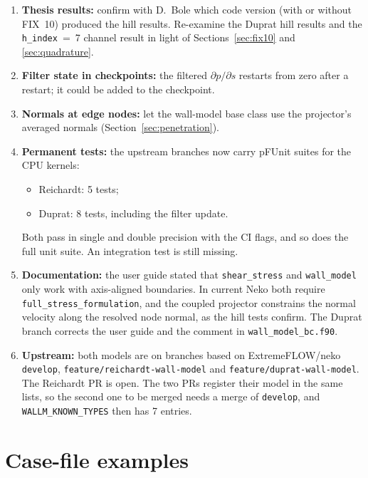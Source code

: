 \documentclass[11pt,a4paper]{article}
\newcommand{\code}[1]{\texttt{#1}}
\newcommand{\dpds}{\partial p/\partial s}
\begin{document}
\begin{enumerate}
    version this matched the \code{force\_torque} skin friction of the hill
    wall to 0.4\,\%; with the reversed stress it is 16\,\% too high
    (Section~\ref{sec:dupv2}). A signed streamwise $\tau_w$ would resolve
    the bubble and the reversed branch.
  \item \textbf{Thesis results:} confirm with D.~Bole which code version
    (with or without FIX~10) produced the hill results. Re-examine the
    Duprat hill results and the \code{h\_index}~=~7 channel result in light
    of Sections~\ref{sec:fix10} and \ref{sec:quadrature}.
  \item \textbf{Filter state in checkpoints:} the filtered $\dpds$ restarts
    from zero after a restart; it could be added to the checkpoint.
  \item \textbf{Normals at edge nodes:} let the wall-model base class use
    the projector's averaged normals (Section~\ref{sec:penetration}).
  \item \textbf{Permanent tests:} the upstream branches now carry pFUnit
    suites for the CPU kernels:
    \begin{itemize}
      \item Reichardt: 5 tests;
      \item Duprat: 8 tests, including the filter update.
    \end{itemize}
    Both pass in single and double precision with the CI flags, and so does
    the full unit suite. An integration test is still missing.
  \item \textbf{Documentation:} the user guide stated that
    \code{shear\_stress} and \code{wall\_model} only work with axis-aligned
    boundaries. In current Neko both require \code{full\_stress\_formulation},
    and the coupled projector constrains the normal velocity along the
    resolved node normal, as the hill tests confirm. The Duprat branch
    corrects the user guide and the comment in \code{wall\_model\_bc.f90}.
  \item \textbf{Upstream:} both models are on branches based on
    ExtremeFLOW/neko \code{develop}, \code{feature/reichardt-wall-model} and
    \code{feature/duprat-wall-model}. The Reichardt PR is open. The two PRs
    register their model in the same lists, so the second one to be merged
    needs a merge of \code{develop}, and \code{WALLM\_KNOWN\_TYPES} then has
    7 entries.
\end{enumerate}

\appendix
\section{Case-file examples}
\end{document}
